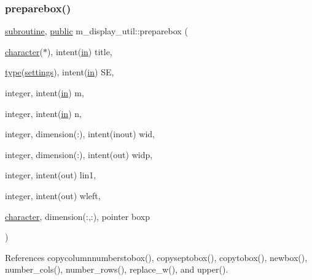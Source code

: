 \subsubsection{\texorpdfstring{preparebox()}{preparebox()}}
{\footnotesize\ttfamily \hyperlink{M__stopwatch_83_8txt_acfbcff50169d691ff02d4a123ed70482}{subroutine}, \hyperlink{M__stopwatch_83_8txt_a2f74811300c361e53b430611a7d1769f}{public} m\+\_\+display\+\_\+util\+::preparebox (\begin{DoxyParamCaption}\item[{\hyperlink{option__stopwatch_83_8txt_abd4b21fbbd175834027b5224bfe97e66}{character}($\ast$), intent(\hyperlink{M__journal_83_8txt_afce72651d1eed785a2132bee863b2f38}{in})}]{title,  }\item[{\hyperlink{stop__watch_83_8txt_a70f0ead91c32e25323c03265aa302c1c}{type}(\hyperlink{structm__display__util_1_1settings}{settings}), intent(\hyperlink{M__journal_83_8txt_afce72651d1eed785a2132bee863b2f38}{in})}]{SE,  }\item[{integer, intent(\hyperlink{M__journal_83_8txt_afce72651d1eed785a2132bee863b2f38}{in})}]{m,  }\item[{integer, intent(\hyperlink{M__journal_83_8txt_afce72651d1eed785a2132bee863b2f38}{in})}]{n,  }\item[{integer, dimension(\+:), intent(inout)}]{wid,  }\item[{integer, dimension(\+:), intent(out)}]{widp,  }\item[{integer, intent(out)}]{lin1,  }\item[{integer, intent(out)}]{wleft,  }\item[{\hyperlink{option__stopwatch_83_8txt_abd4b21fbbd175834027b5224bfe97e66}{character}, dimension(\+:,\+:), pointer}]{boxp }\end{DoxyParamCaption})}



References copycolumnnumberstobox(), copyseptobox(), copytobox(), newbox(), number\+\_\+cols(), number\+\_\+rows(), replace\+\_\+w(), and upper().

